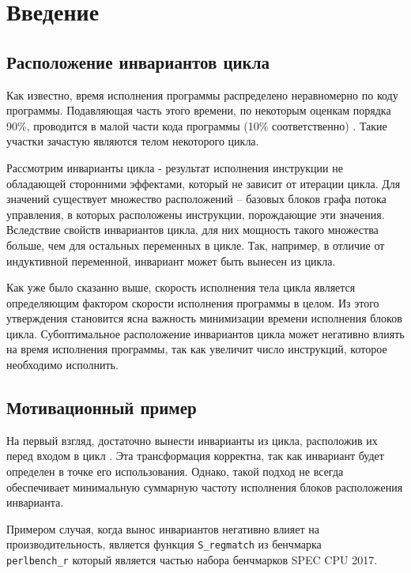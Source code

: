 \chapter*{Введение}

\section*{Расположение инвариантов цикла}

Как известно, время исполнения программы распределено неравномерно по коду программы.
Подавляющая часть этого времени, по некоторым оценкам порядка 90\%, проводится в малой части кода программы (10\% соответственно) \cite{Aho_Ullman_focs}.
Такие участки зачастую являются телом некоторого цикла.

Рассмотрим инварианты цикла - результат исполнения инструкции не обладающей сторонними эффектами, который не зависит от итерации цикла.
Для значений существует множество расположений -- базовых блоков графа потока управления, в которых расположены инструкции, порождающие эти значения.
Вследствие свойств инвариантов цикла, для них мощность такого множества больше, чем для остальных переменных в цикле.
Так, например, в отличие от индуктивной переменной, инвариант может быть вынесен из цикла.

Как уже было сказанно выше, скорость исполнения тела цикла является определяющим фактором скорости исполнения программы в целом.
Из этого утверждения становится ясна важность минимизации времени исполнения блоков цикла.
Субоптимальное расположение инвариантов цикла может негативно влиять на время исполнения программы, так как увеличит число инструкций, которое необходимо исполнить.

\section*{Мотивационный пример}

На первый взгляд, достаточно вынести инварианты из цикла, расположив их перед входом в цикл \cite{Aho_Sethi_Ullman_9_1_7}.
Эта трансформация корректна, так как инвариант будет определен в точке его использования.
Однако, такой подход не всегда обеспечивает минимальную суммарную частоту исполнения блоков расположения инварианта.

Примером случая, когда вынос инвариантов негативно влияет на производительность, является функция \texttt{S\_regmatch} из бенчмарка\\\texttt{perlbench\_r} который является частью набора бенчмарков SPEC CPU\textsuperscript{\tiny\textregistered} 2017.

